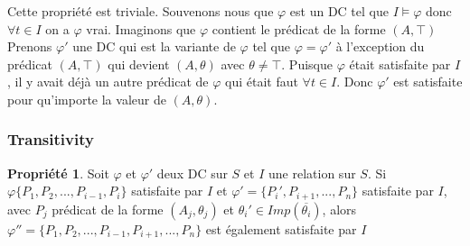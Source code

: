 \documentclass[letterpaper, 12pt]{report}
\theoremstyle{definition}
\newtheorem{myprop}{Propriété}
\begin{document}
Cette propriété est triviale. Souvenons nous que $\varphi$ est un DC tel que $I \models \varphi$ donc $\forall t \in I$ on a $\varphi$ vrai. Imaginons que $\varphi$ contient le prédicat de la forme $(A,\top)$ Prenons $\varphi'$ une DC qui est la variante de $\varphi$ tel que $\varphi =  \varphi'$ à l'exception du prédicat $(A,\top)$ qui devient $(A,\theta)$ avec $ \theta \neq \top$. Puisque $\varphi$ était satisfaite par $I$, il y avait déjà un autre prédicat de $\varphi$ qui était faut $\forall t \in I$. Donc $\varphi'$ est satisfaite pour qu'importe la valeur de $(A,\theta)$.

\subsubsection{Transitivity}
%
%
%
%
%	
%	
%	

\begin{myprop}
	Soit $\varphi$ et $\varphi'$ deux DC sur $S$ et $I$ une relation sur $S$. Si $\varphi \{P_1,P_2,...,P_{i-1},P_i\}$ satisfaite par $I$ et $\varphi ' = \{P_i',P_{i+1},...,P_n \}$ satisfaite par $I$, avec $P_j$ prédicat de la forme $(A_j,\theta_j)$ et $\theta_i' \in Imp(\overline{\theta_i})$, alors $\varphi'' = \{P_1,P_2,...,P_{i-1},P_{i+1},...,P_n\}$ est également satisfaite par $I$
\end{myprop}
\end{document}
